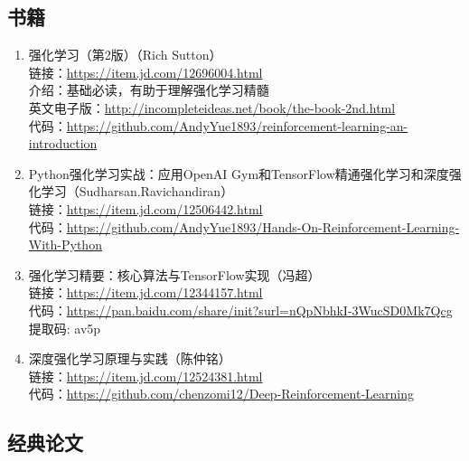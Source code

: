 \documentclass[lang=cn,11pt,a4paper]{eleganttemplate}
\begin{document}
\subsection{书籍}
\begin{enumerate}
    \item 强化学习（第2版）（Rich Sutton）\\ 链接：\href{https://item.jd.com/12696004.html}{https://item.jd.com/12696004.html} \\
    介绍：基础必读，有助于理解强化学习精髓 \\
    英文电子版：\href{http://incompleteideas.net/book/the-book-2nd.html}{http://incompleteideas.net/book/the-book-2nd.html}  \\
    代码：\href{https://github.com/AndyYue1893/reinforcement-learning-an-introduction}{https://github.com/AndyYue1893/reinforcement-learning-an-introduction}  
    \item Python强化学习实战：应用OpenAI Gym和TensorFlow精通强化学习和深度强化学习（Sudharsan.Ravichandiran）\\
    链接：\href{https://item.jd.com/12506442.html}{https://item.jd.com/12506442.html}  \\
    代码：\href{https://github.com/AndyYue1893/Hands-On-Reinforcement-Learning-With-Python}{https://github.com/AndyYue1893/Hands-On-Reinforcement-Learning-With-Python} 
    \item 强化学习精要：核心算法与TensorFlow实现（冯超）\\
    链接：\href{https://item.jd.com/12344157.html}{https://item.jd.com/12344157.html}  \\
    代码：\href{https://pan.baidu.com/share/init?surl=nQpNbhkI-3WucSD0Mk7Qcg}{https://pan.baidu.com/share/init?surl=nQpNbhkI-3WucSD0Mk7Qcg} 提取码: av5p
    \item 深度强化学习原理与实践（陈仲铭）\\
    链接：\href{https://item.jd.com/12524381.html}{https://item.jd.com/12524381.html} \\
    代码：\href{https://github.com/chenzomi12/Deep-Reinforcement-Learning}{https://github.com/chenzomi12/Deep-Reinforcement-Learning} 
\end{enumerate}

\subsection{经典论文}
\end{document}
